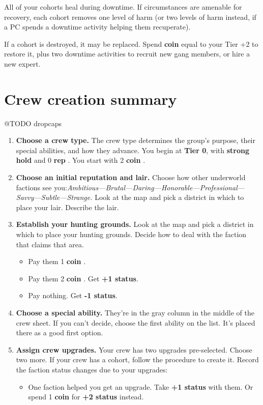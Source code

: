 \documentclass[11pt,fleqn,a5paper]{book}
\newcommand{\gameterm}[1]{\textbf{#1}}
\begin{document}
All of your cohorts heal during downtime. If circumstances are amenable for recovery, each cohort removes one level of harm (or two levels of harm instead, if a PC spends a downtime activity helping them recuperate).

If a cohort is destroyed, it may be replaced. Spend \gameterm{coin}  equal to your Tier +2 to restore it, plus two downtime activities to recruit new gang members, or hire a new expert.

\section{Crew creation summary}

@TODO dropcaps

\begin{enumerate}
	\item \textbf{Choose a crew type.} The crew type determines the group’s purpose, their special abilities, and how they advance.
		You begin at \textbf{Tier 0}, with \textbf{strong hold} and 0 \gameterm{rep} . You start with 2 \gameterm{coin} .
	\item \textbf{Choose an initial reputation and lair.} Choose how other underworld factions see you:\emph{Ambitious---Brutal---Daring---Honorable---Professional---Savvy---Subtle---Strange.} Look at the map and pick a district in which to place your lair. Describe the lair.
	\item \textbf{Establish your hunting grounds.} Look at the map and pick a district in which to place your hunting grounds. Decide how to deal with the faction that claims that area.
		\begin{itemize}
		\item Pay them 1 \gameterm{coin} .
		\item Pay them 2 \gameterm{coin} . Get \textbf{+1 status}.
		\item Pay nothing. Get \textbf{-1 status}.
		\end{itemize}
	\item \textbf{Choose a special ability.} They’re in the gray column in the middle of the crew sheet. If you can’t decide, choose the first ability on the list. It’s placed there as a good first option.
	\item \textbf{Assign crew upgrades.} Your crew has two upgrades pre-selected. Choose two more. If your crew has a cohort, follow the procedure to create it. Record the faction status changes due to your upgrades:
		\begin{itemize}
		\item One faction helped you get an upgrade. Take \textbf{+1 status} with them. Or spend 1 \gameterm{coin}  for \textbf{+2 status} instead.

\end{itemize}
\end{enumerate}
\end{document}
